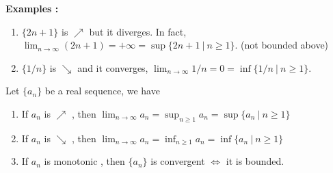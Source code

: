 \textbf{Examples :}
\begin{enumerate}
\item $\{2n+1\}$ is $\nearrow$ but it diverges. In fact, $\lim_{n\to\infty}(2n+1) = +\infty = \sup \{2n+1\ |\ n\geq 1\}$. (not bounded above)
\item $\{1/n\}$ is $\searrow$ and it converges, $\lim_{n\to\infty} 1/n = 0 = \inf \{1/n\ |\ n\geq 1\}$.
\end{enumerate} 
\begin{thm}Let $\{a_n\}$ be a real sequence, we have
 	\begin{enumerate}
 	\item If $a_n$ is $\nearrow$ , then $\lim_{n\to\infty} a_n = \sup_{n\geq 1} a_n  = \sup\{a_n\ |\ n \geq 1\}$
	\item If $a_n$ is $\searrow$ , then $\lim_{n\to\infty} a_n = \inf_{n\geq 1} a_n  = \inf\{a_n\ |\ n \geq 1\}$
	\item If $a_n$ is monotonic , then $\{a_n\}$ is convergent $\Leftrightarrow$ it is bounded. 
 	\end{enumerate}
\end{thm}
	
